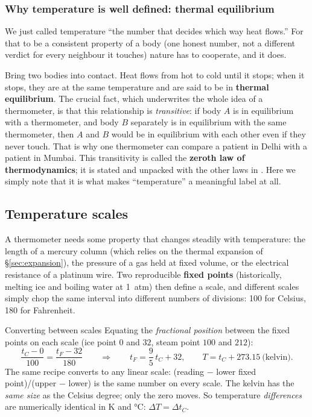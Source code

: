 
\subsubsection{Why temperature is well defined: thermal equilibrium}

We just called temperature ``the number that decides which way heat flows.'' For that to be a
consistent property of a body (one honest number, not a different verdict for every neighbour it
touches) nature has to cooperate, and it does.

Bring two bodies into contact. Heat flows from hot to cold until it stops; when it stops, they are at
the same temperature and are said to be in \textbf{thermal equilibrium}. The crucial fact, which
underwrites the whole idea of a thermometer, is that this relationship is \emph{transitive}: if body
$A$ is in equilibrium with a thermometer, and body $B$ separately is in equilibrium with the same
thermometer, then $A$ and $B$ would be in equilibrium with each other even if they never touch. That is
why one thermometer can compare a patient in Delhi with a patient in Mumbai. This transitivity is called
the \textbf{zeroth law of thermodynamics}; it is stated and unpacked with the other laws in
. Here we simply note that it is what makes ``temperature'' a meaningful label at all.

\subsection{Temperature scales}

A thermometer needs some property that changes steadily with temperature: the length of a mercury
column (which relies on the thermal expansion of \S\ref{sec:expansion}), the pressure of a gas held at
fixed volume, or the electrical resistance of a platinum wire. Two reproducible \textbf{fixed points}
(historically, melting ice and boiling water at \SI{1}{atm}) then define a scale, and different scales
simply chop the same interval into different numbers of divisions: 100 for Celsius, 180 for
Fahrenheit.

\begin{keybox}{Converting between scales}
Equating the \emph{fractional position} between the fixed points on each scale (ice point $0$ and
$32$, steam point $100$ and $212$):
\[
\frac{t_C - 0}{100} = \frac{t_F - 32}{180}
\qquad\Longrightarrow\qquad
t_F = \frac{9}{5}\,t_C + 32 ,
\qquad
T = t_C + 273.15 \ \text{(kelvin)}.
\]
The same recipe converts to any linear scale: (reading $-$ lower fixed point)/(upper $-$ lower) is the
same number on every scale. The kelvin has the \emph{same size} as the Celsius degree; only the zero
moves. So temperature \emph{differences} are numerically identical in \si{K} and \si{\celsius}:
$\Delta T = \Delta t_C$.
\end{keybox}

